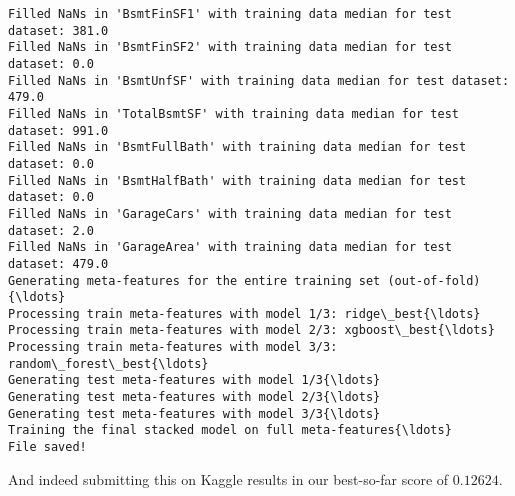 \documentclass[11pt]{article}
\begin{document}
    \begin{Verbatim}[commandchars=\\\{\}]
Filled NaNs in 'BsmtFinSF1' with training data median for test dataset: 381.0
Filled NaNs in 'BsmtFinSF2' with training data median for test dataset: 0.0
Filled NaNs in 'BsmtUnfSF' with training data median for test dataset: 479.0
Filled NaNs in 'TotalBsmtSF' with training data median for test dataset: 991.0
Filled NaNs in 'BsmtFullBath' with training data median for test dataset: 0.0
Filled NaNs in 'BsmtHalfBath' with training data median for test dataset: 0.0
Filled NaNs in 'GarageCars' with training data median for test dataset: 2.0
Filled NaNs in 'GarageArea' with training data median for test dataset: 479.0
Generating meta-features for the entire training set (out-of-fold){\ldots}
Processing train meta-features with model 1/3: ridge\_best{\ldots}
Processing train meta-features with model 2/3: xgboost\_best{\ldots}
Processing train meta-features with model 3/3: random\_forest\_best{\ldots}
Generating test meta-features with model 1/3{\ldots}
Generating test meta-features with model 2/3{\ldots}
Generating test meta-features with model 3/3{\ldots}
Training the final stacked model on full meta-features{\ldots}
File saved!
    \end{Verbatim}

    And indeed submitting this on Kaggle results in our best-so-far score of
\(0.12624\).


    
    
    
\end{document}
